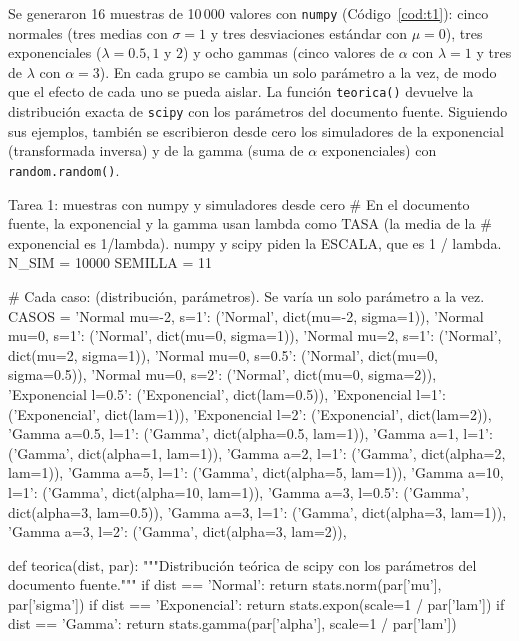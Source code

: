 \documentclass[11pt,letterpaper]{article}
\begin{document}
Se generaron 16 muestras de 10\,000 valores con \texttt{numpy} (Código~\ref{cod:t1}): cinco normales (tres medias con $\sigma = 1$ y tres desviaciones estándar con $\mu = 0$), tres exponenciales ($\lambda = 0.5, 1$ y $2$) y ocho gammas (cinco valores de $\alpha$ con $\lambda = 1$ y tres de $\lambda$ con $\alpha = 3$). En cada grupo se cambia un solo parámetro a la vez, de modo que el efecto de cada uno se pueda aislar. La función \texttt{teorica()} devuelve la distribución exacta de \texttt{scipy} con los parámetros del documento fuente. Siguiendo sus ejemplos, también se escribieron desde cero los simuladores de la exponencial (transformada inversa) y de la gamma (suma de $\alpha$ exponenciales) con \texttt{random.random()}.

\begin{codigo}[label=cod:t1]{Tarea 1: muestras con numpy y simuladores desde cero}
# En el documento fuente, la exponencial y la gamma usan lambda como TASA (la media de la
# exponencial es 1/lambda). numpy y scipy piden la ESCALA, que es 1 / lambda.
N_SIM = 10000
SEMILLA = 11

# Cada caso: (distribución, parámetros). Se varía un solo parámetro a la vez.
CASOS = {
    'Normal mu=-2, s=1':   ('Normal', dict(mu=-2, sigma=1)),
    'Normal mu=0, s=1':    ('Normal', dict(mu=0, sigma=1)),
    'Normal mu=2, s=1':    ('Normal', dict(mu=2, sigma=1)),
    'Normal mu=0, s=0.5':  ('Normal', dict(mu=0, sigma=0.5)),
    'Normal mu=0, s=2':    ('Normal', dict(mu=0, sigma=2)),
    'Exponencial l=0.5':   ('Exponencial', dict(lam=0.5)),
    'Exponencial l=1':     ('Exponencial', dict(lam=1)),
    'Exponencial l=2':     ('Exponencial', dict(lam=2)),
    'Gamma a=0.5, l=1':    ('Gamma', dict(alpha=0.5, lam=1)),
    'Gamma a=1, l=1':      ('Gamma', dict(alpha=1, lam=1)),
    'Gamma a=2, l=1':      ('Gamma', dict(alpha=2, lam=1)),
    'Gamma a=5, l=1':      ('Gamma', dict(alpha=5, lam=1)),
    'Gamma a=10, l=1':     ('Gamma', dict(alpha=10, lam=1)),
    'Gamma a=3, l=0.5':    ('Gamma', dict(alpha=3, lam=0.5)),
    'Gamma a=3, l=1':      ('Gamma', dict(alpha=3, lam=1)),
    'Gamma a=3, l=2':      ('Gamma', dict(alpha=3, lam=2)),
}


def teorica(dist, par):
    """Distribución teórica de scipy con los parámetros del documento fuente."""
    if dist == 'Normal':
        return stats.norm(par['mu'], par['sigma'])
    if dist == 'Exponencial':
        return stats.expon(scale=1 / par['lam'])
    if dist == 'Gamma':
        return stats.gamma(par['alpha'], scale=1 / par['lam'])



\end{codigo}
\end{document}
